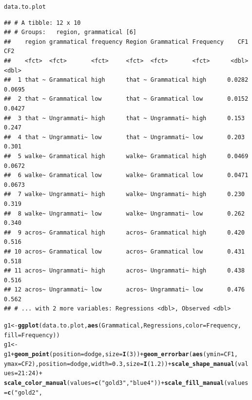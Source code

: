 \documentclass{article}\usepackage[]{graphicx}\usepackage[]{color}
\makeatletter
\newcommand{\hlnum}[1]{\textcolor[rgb]{0.686,0.059,0.569}{#1}}%
\newcommand{\hlstr}[1]{\textcolor[rgb]{0.192,0.494,0.8}{#1}}%
\newcommand{\hlopt}[1]{\textcolor[rgb]{0,0,0}{#1}}%
\newcommand{\hlstd}[1]{\textcolor[rgb]{0.345,0.345,0.345}{#1}}%
\newcommand{\hlkwb}[1]{\textcolor[rgb]{0.69,0.353,0.396}{#1}}%
\newcommand{\hlkwc}[1]{\textcolor[rgb]{0.333,0.667,0.333}{#1}}%
\newcommand{\hlkwd}[1]{\textcolor[rgb]{0.737,0.353,0.396}{\textbf{#1}}}%
\newenvironment{kframe}{%
 \def\at@end@of@kframe{}%
 \ifinner\ifhmode%
  \def\at@end@of@kframe{\end{minipage}}%
  \begin{minipage}{\columnwidth}%
 \fi\fi%
 \def\FrameCommand##1{\hskip\@totalleftmargin \hskip-\fboxsep
 \colorbox{shadecolor}{##1}\hskip-\fboxsep
     \hskip-\linewidth \hskip-\@totalleftmargin \hskip\columnwidth}%
 \MakeFramed {\advance\hsize-\width
   \@totalleftmargin\z@ \linewidth\hsize
   \@setminipage}}%
 {\par\unskip\endMakeFramed%
 \at@end@of@kframe}
\newenvironment{knitrout}{}{} %
\makeatother
\begin{document}
\begin{knitrout}
\begin{kframe}
{\ttfamily\noindent\itshape\color{messagecolor}{\#\# `summarise()` has grouped output by 'region', 'grammatical'. You can override using the `.groups` argument.}}\begin{alltt}
\hlstd{data.to.plot}
\end{alltt}
\begin{verbatim}
## # A tibble: 12 x 10
## # Groups:   region, grammatical [6]
##    region grammatical frequency Region Grammatical Frequency    CF1    CF2
##    <fct>  <fct>       <fct>     <fct>  <fct>       <fct>      <dbl>  <dbl>
##  1 that ~ Grammatical high      that ~ Grammatical high      0.0282 0.0695
##  2 that ~ Grammatical low       that ~ Grammatical low       0.0152 0.0427
##  3 that ~ Ungrammati~ high      that ~ Ungrammati~ high      0.153  0.247 
##  4 that ~ Ungrammati~ low       that ~ Ungrammati~ low       0.203  0.301 
##  5 walke~ Grammatical high      walke~ Grammatical high      0.0469 0.0672
##  6 walke~ Grammatical low       walke~ Grammatical low       0.0471 0.0673
##  7 walke~ Ungrammati~ high      walke~ Ungrammati~ high      0.230  0.319 
##  8 walke~ Ungrammati~ low       walke~ Ungrammati~ low       0.262  0.340 
##  9 acros~ Grammatical high      acros~ Grammatical high      0.420  0.516 
## 10 acros~ Grammatical low       acros~ Grammatical low       0.431  0.518 
## 11 acros~ Ungrammati~ high      acros~ Ungrammati~ high      0.438  0.516 
## 12 acros~ Ungrammati~ low       acros~ Ungrammati~ low       0.476  0.562 
## # ... with 2 more variables: Regressions <dbl>, Observed <dbl>
\end{verbatim}
\begin{alltt}
\hlstd{g1} \hlkwb{<-} \hlkwd{ggplot}\hlstd{(data.to.plot,} \hlkwd{aes}\hlstd{(Grammatical, Regressions,} \hlkwc{color} \hlstd{= Frequency,}
    \hlkwc{fill} \hlstd{= Frequency))}
\hlstd{g1} \hlkwb{<-} \hlstd{g1} \hlopt{+} \hlkwd{geom_point}\hlstd{(}\hlkwc{position} \hlstd{= dodge,} \hlkwc{size} \hlstd{=} \hlkwd{I}\hlstd{(}\hlnum{3}\hlstd{))} \hlopt{+} \hlkwd{geom_errorbar}\hlstd{(}\hlkwd{aes}\hlstd{(}\hlkwc{ymin} \hlstd{= CF1,}
    \hlkwc{ymax} \hlstd{= CF2),} \hlkwc{position} \hlstd{= dodge,} \hlkwc{width} \hlstd{=} \hlnum{0.3}\hlstd{,} \hlkwc{size} \hlstd{=} \hlkwd{I}\hlstd{(}\hlnum{1.2}\hlstd{))} \hlopt{+} \hlkwd{scale_shape_manual}\hlstd{(}\hlkwc{values} \hlstd{=} \hlnum{21}\hlopt{:}\hlnum{24}\hlstd{)} \hlopt{+}
    \hlkwd{scale_color_manual}\hlstd{(}\hlkwc{values} \hlstd{=} \hlkwd{c}\hlstd{(}\hlstr{"gold3"}\hlstd{,} \hlstr{"blue4"}\hlstd{))} \hlopt{+} \hlkwd{scale_fill_manual}\hlstd{(}\hlkwc{values} \hlstd{=} \hlkwd{c}\hlstd{(}\hlstr{"gold2"}\hlstd{,}

\end{alltt}
\end{kframe}
\end{knitrout}
\end{document}
